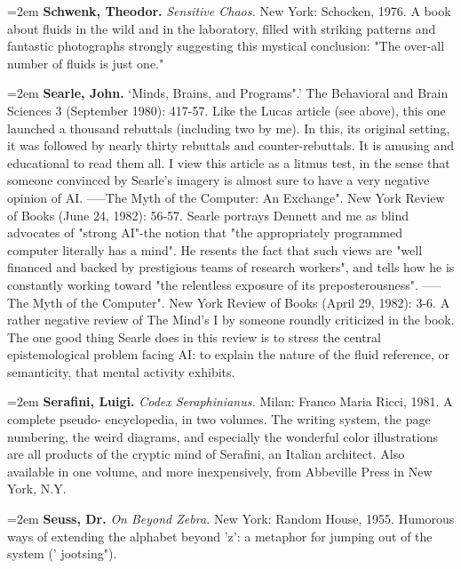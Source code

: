 \par\noindent\hangindent=2em {\bf Schwenk, Theodor.} {\it Sensitive Chaos.} New York: Schocken, 1976. A book about fluids in the wild and in the laboratory, filled with striking patterns and fantastic photographs strongly suggesting this mystical conclusion: "The over-all number of fluids is just one."

\par\noindent\hangindent=2em {\bf Searle, John.} `Minds, Brains, and Programs".' The Behavioral and Brain Sciences 3 (September 1980): 417-57. Like the Lucas article (see above), this one launched a thousand rebuttals (including two by me). In this, its original setting, it was followed by nearly thirty rebuttals and counter-rebuttals. It is amusing and educational to read them all. I view this article as a litmus test, in the sense that someone convinced by Searle's imagery is almost sure to have a very negative opinion of AI. -----The Myth of the Computer: An Exchange". New York Review of Books (June 24, 1982): 56-57. Searle portrays Dennett and me as blind advocates of "strong AI"-the notion that "the appropriately programmed computer literally has a mind". He resents the fact that such views are "well financed and backed by prestigious teams of research workers", and tells how he is constantly working toward "the relentless exposure of its preposterousness". -----The Myth of the Computer". New York Review of Books (April 29, 1982): 3-6. A rather negative review of The Mind's I by someone roundly criticized in the book. The one good thing Searle does in this review is to stress the central epistemological problem facing AI: to explain the nature of the fluid reference, or semanticity, that mental activity exhibits.

\par\noindent\hangindent=2em {\bf Serafini, Luigi.} {\it Codex Seraphinianus.} Milan: Franco Maria Ricci, 1981. A complete pseudo- encyclopedia, in two volumes. The writing system, the page numbering, the weird diagrams, and especially the wonderful color illustrations are all products of the cryptic mind of Serafini, an Italian architect. Also available in one volume, and more inexpensively, from Abbeville Press in New York, N.Y.

\par\noindent\hangindent=2em {\bf Seuss, Dr.} {\it On Beyond Zebra.} New York: Random House, 1955. Humorous ways of extending the alphabet beyond 'z': a metaphor for jumping out of the system (' jootsing").

